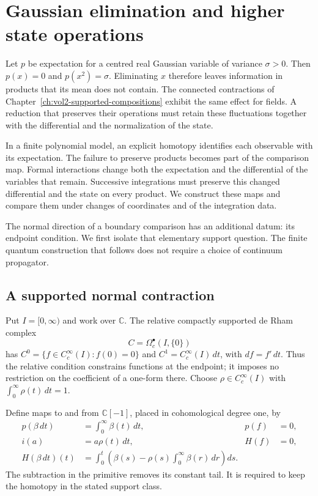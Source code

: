 \chapter{Gaussian elimination and higher state operations}
\label{ch:vol2-gaussian-elimination}

Let $p$ be expectation for a centred real Gaussian variable of
variance $\sigma>0$. Then $p(x)=0$ and $p(x^2)=\sigma$.
Eliminating $x$ therefore leaves information in products that its
mean does not contain. The connected contractions of
Chapter~\ref{ch:vol2-supported-compositions} exhibit the same effect
for fields. A reduction that preserves their operations must retain
these fluctuations together with the differential and the
normalization of the state.

In a finite polynomial model, an explicit homotopy identifies
each observable with its expectation. The failure to preserve
products becomes part of the comparison map. Formal interactions
change both the expectation and the differential of the variables
that remain. Successive integrations must preserve this changed
differential and the state on every product. We construct these
maps and compare them under changes of coordinates and of the
integration data.

The normal direction of a boundary comparison has an additional
datum: its endpoint condition. We first isolate that elementary
support question. The finite quantum construction that follows
does not require a choice of continuum propagator.

\section{A supported normal contraction}
\label{sec:vol2-normal-contraction}

Put $I=[0,\infty)$ and work over $\mathbb C$. The relative compactly
supported de Rham complex
\[
 C=\Omega_c^\bullet(I,\{0\})
\]
has $C^0=\{f\in C_c^\infty(I):f(0)=0\}$ and
$C^1=C_c^\infty(I)\,dt$, with $df=f'\,dt$.
Thus the relative condition constrains functions at the endpoint;
it imposes no restriction on the coefficient of a one-form there.
Choose $\rho\in C_c^\infty(I)$ with
$\int_0^\infty\rho(t)\,dt=1$.

Define maps to and from $\mathbb C[-1]$, placed in cohomological
degree one, by
\begin{equation}\label{eq:vol2-normal-maps}
 \begin{aligned}
 p(\beta\,dt)&=\int_0^\infty\beta(t)\,dt,& p(f)&=0,\\
 i(a)&=a\rho(t)\,dt,& H(f)&=0,\\
 H(\beta\,dt)(t)
   &=\int_0^t\left(\beta(s)-\rho(s)
                    \int_0^\infty\beta(r)\,dr\right)ds.
 \end{aligned}
\end{equation}
The subtraction in the primitive removes its constant tail.
It is required to keep the homotopy in the stated support class.

